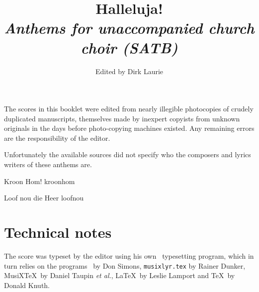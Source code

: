 \documentclass[a4paper]{article}
\title{    {\Huge Halleluja!\\ [2ex]}
  {\Large\textit{Anthems for unaccompanied church choir (SATB)}\\ [5ex]}}
\author{\Large Edited by Dirk Laurie}
\date{}
\let\Writebarno\writebarno
\begin{document}
  \maketitle
  \thispagestyle{empty}
  \tableofcontents
  \section*{} %
The scores in this booklet were edited from nearly illegible photocopies
of crudely duplicated manuscripts, themselves made by inexpert copyists 
from unknown originals in the days before photo-copying machines existed.
Any remaining errors are the responsibility of the editor.

Unfortunately the available sources did not specify who the composers
and lyrics writers of these anthems are.
\pagebreak

\def\writebarno{\vbox to 24pt{}{\Writebarno}}
\begin{Score} {Kroon Hom!} {kroonhom} \end{Score}
\def\writebarno{\vbox to 16pt{}{\Writebarno}}
\begin{Score} {Loof nou die Heer} {loofnou} \end{Score}

  \section*{Technical notes}
The score was typeset by the editor using his own \MTx\ typesetting program, 
which in turn relies on the programs \PMX\ by Don Simons, \texttt{musixlyr.tex}
by Rainer Dunker, MusiX\TeX\ by Daniel 
Taupin \textit{et al.}, \LaTeX\ by Leslie Lamport and \TeX\ by Donald Knuth.
\end{document}
